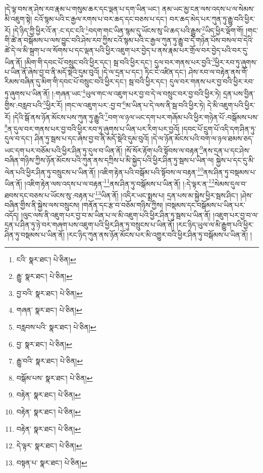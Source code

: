 །དེ་ལྟ་བས་ན་ཤེས་རབ་རྣམ་པ་གསུམ་ཆར་དང་ལྡན་པ་དག་ཡིན་ཡང་། ནམ་ཡང་མྱ་ངན་ལས་འདས་པ་ལ་སེམས་མི་འཇུག་སྟེ། ངའོ་སྙམ་པའི་ང་རྒྱལ་རགས་པ་བར་ཆད་དང་བཅས་པ་དང་། བར་ཆད་མེད་པར་ཀུན་ཏུ་རྒྱུ་བའི་ཕྱིར་རོ། །དེ་ཉིད་ཀྱི་ཕྱིར་འོ་ན་:ང་དང་ངའི་\footnote{ངའི་  སྣར་ཐང་།  པེ་ཅིན། }བདག་གང་ཡིན་སྙམ་དུ་ཡོངས་སུ་ཡི་ཆད་པའི་རྒྱུས་\footnote{རྒྱུ་  སྣར་ཐང་།  པེ་ཅིན། }ཡིད་ཕྱིར་ལྡོག་གོ། །གང་གི་ཚེ་ན་བསྒོམས་པ་ལས་བྱུང་བའི་ཤེས་རབ་ཀྱིས་ངའོ་སྙམ་པའི་ང་རྒྱལ་ཀུན་ཏུ་རྒྱུ་བ་དེ་གཉེན་པོས་བསལ་བ་དེའི་ཚེ་དེ་ལ་མི་སྐྲག་པ་ལ་སོགས་པ་དང་ལྡན་པའི་ཕྱིར་འཇུག་པར་བྱེད་པ་ནས་རྣམ་པར་གྲོལ་བར་བྱེད་པའི་བར་དུ་ཡིན་ནོ། །མིག་གི་དབང་པོ་བསྲུང་བའི་ཕྱིར་དང་། སྦ་བའི་ཕྱིར་དང་། དུལ་བར་གནས་པར་བྱའི་\footnote{བྱ་བའི་  སྣར་ཐང་།  པེ་ཅིན། }ཕྱིར་རབ་ཏུ་ཞུགས་པ་ཡིན་ནོ་ཞེས་བྱ་བ་ནི་མདོ་སྡེའི་དུམ་བུའོ། །དེ་ལ་དྲན་པ་དང་། ཏིང་ངེ་འཛིན་དང་། ཤེས་རབ་ལ་བརྟེན་ནས་གོ་རིམས་བཞིན་དུ་མིག་གི་དབང་པོ་བསྲུང་བའི་ཕྱིར་དང་། སྦ་བའི་ཕྱིར་དང་། དུལ་བར་གནས་པར་བྱ་བའི་ཕྱིར་རབ་ཏུ་ཞུགས་པ་ཡིན་ནོ། །:གཞན་ཡང་\footnote{གཞན་  སྣར་ཐང་།  པེ་ཅིན། }ཡུལ་གང་ལ་འཇུག་པར་བྱ་བ་དེ་ལ་བསྲུང་བར་བྱ་བའི་ཕྱིར་ཏེ། དྲན་པས་བྱིན་གྱིས་:བརླབ་པའི་\footnote{བརླབས་པའི་  སྣར་ཐང་།  པེ་ཅིན། }ཕྱིར་རོ། །གང་ལ་འཇུག་པར་:བྱ་བ་\footnote{བྱ་  སྣར་ཐང་།  པེ་ཅིན། }མ་ཡིན་པ་དེ་ལས་ནི་སྦ་བའི་ཕྱིར་ཏེ། དེ་མི་འཇུག་པའི་ཕྱིར་རོ། །དེའི་སྒོ་ནས་ཉོན་མོངས་པས་ཀུན་ཏུ་རྒྱུའི་\footnote{རྒྱུ་བའི་  སྣར་ཐང་།  པེ་ཅིན། }བག་ལ་ཉལ་ཡང་དག་པར་གཞོམ་པའི་ཕྱིར་གཉེན་པོ་:བསྒོམས་པས་\footnote{བསྒོམ་པས་  སྣར་ཐང་།  པེ་ཅིན། }ན་དུལ་བར་གནས་པར་བྱ་བའི་ཕྱིར་རབ་ཏུ་ཞུགས་པ་ཡིན་པར་རིག་པར་བྱའོ། །དབང་པོ་དྲུག་པོ་འདི་དག་ཤིན་ཏུ་དུལ་བ་དང་། ཤིན་ཏུ་སྦས་པ་དང་ཞེས་བྱ་བ་ནི་མདོ་སྡེའི་དུམ་བུའོ། །དེ་ལ་ཉོན་མོངས་པའི་བག་ལ་ཉལ་ཐམས་ཅད་ཡང་དག་པར་བཅོམ་པའི་ཕྱིར་ཤིན་ཏུ་དུལ་བ་ཡིན་ནོ། །སོ་སོར་རྟོག་པའི་སྟོབས་ལ་བརྟན་\footnote{བརྟེན་  སྣར་ཐང་།  པེ་ཅིན། }ནས་དྲན་པ་དང་ཤེས་བཞིན་གཉིས་ཀྱིས་ཉོན་མོངས་པའི་ཀུན་ནས་དཀྲིས་པ་མི་སྐྱེད་པའི་ཕྱིར་ཤིན་ཏུ་སྦས་པ་ཡིན་ལ། སྐྱེས་པ་དང་དུ་མི་ལེན་པའི་ཕྱིར་ཤིན་ཏུ་བསྲུངས་པ་ཡིན་ནོ། །འཇིག་རྟེན་པའི་བསྒོམ་པའི་སྟོབས་ལ་བརྟན་\footnote{བརྟེན་  སྣར་ཐང་།  པེ་ཅིན། }ནས་ཤིན་ཏུ་བསྡམས་པ་ཡིན་ནོ། །འཇིག་རྟེན་ལས་འདས་པ་ལ་བརྟན་\footnote{བརྟེན་  སྣར་ཐང་།  པེ་ཅིན། }ནས་ཤིན་ཏུ་བསྒོམས་པ་ཡིན་ནོ། །:དེ་ལྟར་ན་\footnote{དེ་ལྟར་  སྣར་ཐང་།  པེ་ཅིན། }སེམས་དུལ་བ་ཐབས་དང་བཅས་པ་ཡོངས་སུ་:བརྟན་པ་\footnote{བསྟན་པ་  སྣར་ཐང་།  པེ་ཅིན། }ཡིན་ནོ། །འདིར་ཡང་སྨྲས་པ། དྲན་པས་མ་སྐྱེས་ཕྱིར་སྦས་ཤིང་། །ཤེས་བཞིན་གྱིས་ནི་སྐྱེས་ལས་བསྲུངས། །གནོན་དང་རྩ་བ་བཅོམ་གཉིས་ཀྱིས། །བསྡམས་དང་བསྒོམས་པ་ཡིན་པར་འདོད། །ལུང་ལས་ནི་འཇུག་པར་བྱ་བ་མ་ཡིན་པ་ལ་མི་འཇུག་པའི་ཕྱིར་ཤིན་ཏུ་སྦས་པ་ཡིན་ནོ། །འཇུག་པར་བྱ་བ་ལ་དྲན་པ་ཤིན་ཏུ་ཉེ་བར་གཞག་པས་འཇུག་པའི་ཕྱིར་ཤིན་ཏུ་བསྲུངས་པ་ཡིན་ནོ། །རང་ཉིད་ཡུལ་ལ་མི་རྒྱུག་པའི་ཕྱིར་ཤིན་ཏུ་བསྡམས་པ་ཡིན་ནོ། །རང་ཉིད་ཀུན་ནས་ཉོན་མོངས་པར་མི་འགྱུར་བའི་ཕྱིར་ཤིན་ཏུ་བསྒོམས་པ་ཡིན་ནོ། །
